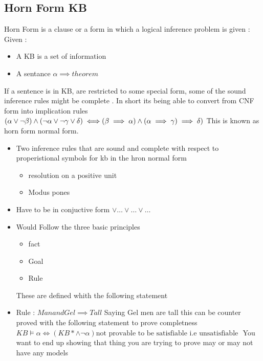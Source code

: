 \documentclass{article}
\theoremstyle{mytheoremstyle}
\theoremstyle{mytheoremstyle}
\theoremstyle{myproblemstyle}
\begin{document}
\subsection{Horn Form KB}
Horn Form is a clause or a form in which a logical inference problem is given :
Given : \\
\begin{itemize}
	\item A KB is a set of information
	\item A sentance $\alpha \implies theorem $
\end{itemize}

If a sentence is in KB, are restricted to some special form, some of the sound inference rules might be complete . In short its being able to convert from CNF form into implication rules
\\
\begin{math}
	(\alpha \lor \neg \beta) \land (\neg \alpha \lor \neg \gamma \lor \delta ) \\
	\iff \\
	(\beta \implies \alpha ) \land (\alpha \implies \gamma) \implies \delta)
\end{math}
This is known as horn form normal form.

\begin{itemize}
	\item Two inference rules that are sound and complete with respect to properistional symbols for kb in the hron normal form
	      \begin{itemize}
		      \item resolution on a positive unit
		      \item Modus pones
	      \end{itemize}
\end{itemize}

\begin{itemize}
	\item Have to be in conjuctive form \( \lor \ldots \lor  \ldots \lor  \ldots \)
	\item Would Follow the three basic principles
	      \begin{itemize}
		      \item fact
		      \item Goal
		      \item Rule
	      \end{itemize}
	      These are defined whith the following statement
	\item Rule :
	      \begin{math}
		      Man and Gel \implies Tall
	      \end{math}
	      Saying Gel men are tall
	      this can be counter proved with the following statement to prove completness
	      \begin{math}
		      KB \models \alpha \iff(KB* \land \neg \alpha) \text{not provable to be satisfiable i.e unsatisfiable }

	      \end{math}
	      You want to end up showing that thing you are trying to prove may or may not have any models
\end{itemize}
\end{document}
